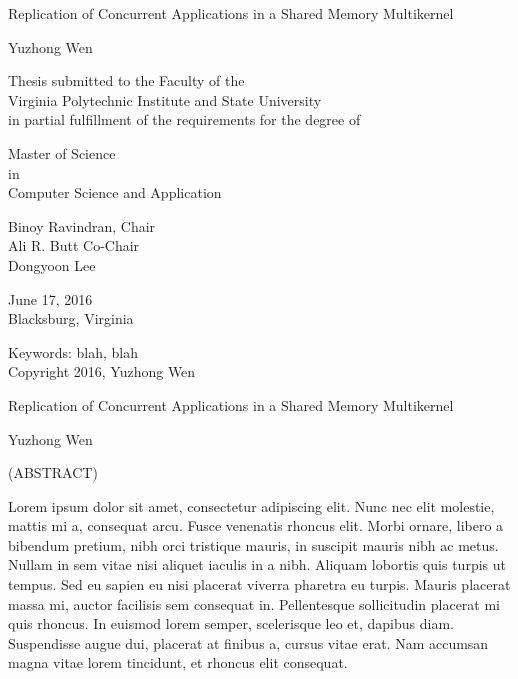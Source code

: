 \documentclass[12pt]{report}
\begin{document}
\thispagestyle{empty}
\begin{center}

{\Large 
Replication of Concurrent Applications in a Shared Memory Multikernel
}

\vfill

Yuzhong Wen

\vfill

Thesis submitted to the Faculty of the \\
Virginia Polytechnic Institute and State University \\
in partial fulfillment of the requirements for the degree of

\vfill

Master of Science \\
in \\
Computer Science and Application

\vfill

Binoy Ravindran, Chair \\
Ali R. Butt Co-Chair \\
Dongyoon Lee

\vfill

June 17, 2016 \\
Blacksburg, Virginia

\vfill

Keywords: blah, blah
\\
Copyright 2016, Yuzhong Wen

\end{center}

\pagebreak

\thispagestyle{empty}
\begin{center}

{\large Replication of Concurrent Applications in a Shared Memory Multikernel}

\vfill

Yuzhong Wen

\vfill

(ABSTRACT)

\vfill

\end{center}

Lorem ipsum dolor sit amet, consectetur adipiscing elit. Nunc nec elit molestie, mattis mi a, consequat arcu. Fusce venenatis rhoncus elit. Morbi ornare, libero a bibendum pretium, nibh orci tristique mauris, in suscipit mauris nibh ac metus. Nullam in sem vitae nisi aliquet iaculis in a nibh. Aliquam lobortis quis turpis ut tempus. Sed eu sapien eu nisi placerat viverra pharetra eu turpis. Mauris placerat massa mi, auctor facilisis sem consequat in. Pellentesque sollicitudin placerat mi quis rhoncus. In euismod lorem semper, scelerisque leo et, dapibus diam. Suspendisse augue dui, placerat at finibus a, cursus vitae erat. Nam accumsan magna vitae lorem tincidunt, et rhoncus elit consequat.
\end{document}
